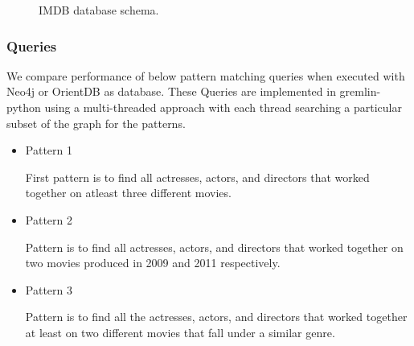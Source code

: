 \begin{figure}[t]
\centering
{}
\caption{IMDB database schema.}
\label{fig:schema}
\centering
\end{figure}

\subsubsection{Queries}

We compare performance of below pattern matching queries when executed with Neo4j or OrientDB as database. These Queries are implemented in gremlin-python using a multi-threaded approach with each thread searching a particular subset of the graph for the patterns. 

\begin{itemize}

\item Pattern 1

First pattern is to find all actresses, actors, and directors that worked together on atleast three different movies.

\item Pattern 2

Pattern is to find all actresses, actors, and directors that worked together on two movies produced in 2009 and 2011 respectively.

\item Pattern 3

Pattern is to find all the actresses, actors, and directors that worked together at least on two different movies that fall under a similar genre.

\end{itemize}

